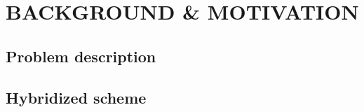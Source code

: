 %
%
%
\section{\large BACKGROUND \& MOTIVATION}


%
%
%
\subsection{Problem description}


%
%
%
\subsection{Hybridized scheme}


\newpage
\newpage